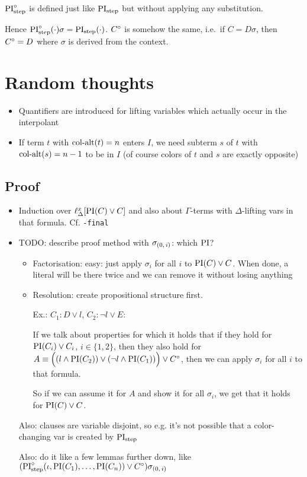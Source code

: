 \documentclass[,%
	draft=false,%
	numbers=noendperiod
	12pt,
	a4paper,
	oneside,%
	openany,
]{memoir}
\begin{document}
\begin{defi}
	$\operatorname{PI}^\circ_{\mathrm{step}}$ is defined just like $\operatorname{PI}_{\mathrm{step}}$ but without applying any substitution.
\end{defi}
Hence $\operatorname{PI}^\circ_{\mathrm{step}}(\cdot) \sigma = \operatorname{PI}_{\mathrm{step}}(\cdot)$.
$C^\circ$ is somehow the same, i.e.\ if $C = D\sigma$, then $C^\circ = D$ where $\sigma$ is derived from the context.

\section{ Random thoughts }

\begin{itemize}
	\item Quantifiers are introduced for lifting variables which actually occur in the interpolant
	\item If term $t$ with $\operatorname{col-alt}(t) = n$ enters $I$, we need subterm $s$ of $t$ with $\operatorname{col-alt}(s) = n-1$ to be in $I$ (of course colors of $t$ and $s$ are exactly opposite)
\end{itemize}


\subsection{ Proof}
\begin{itemize}
	\item Induction over $\ell_{\Delta}^{x}[\operatorname{PI}(C) \lor C]$ and also about $\Gamma$-terms with $\Delta$-lifting vars in that formula. Cf. \texttt{-final}
	\item TODO: describe proof method with $\sigma_{(0,\,i)}$: which $\operatorname{PI}$? 
		\begin{itemize}
			\item Factorisation:
				easy: just apply $\sigma_i$ for all $i$ to $\operatorname{PI}(C) \lor C$. 
				When done, a literal will be there twice and we can remove it without losing anything
			\item Resolution:
				create propositional structure first.

				Ex.: $C_1 : D \lor l$, $ C_2: \lnot l \lor E$:

				If we talk about properties for which it holds that if they hold for $\operatorname{PI}(C_i) \lor C_i$, $i\in\{1,2\}$, then they also hold for $ A \equiv \Big((l \land \operatorname{PI}(C_2)) \lor (\lnot l \land \operatorname{PI}(C_1))\Big) \lor C^\circ$, then we can apply $\sigma_i$ for all $i$ to that formula.

				So if we can assume it for $A$ and show it for all $\sigma_i$, we get that it holds for $\operatorname{PI}(C) \lor C$.

		\end{itemize}

		Also: clauses are variable disjoint, so e.g. it's not possible that a color-changing var is created by $\operatorname{PI}_{\mathrm{step}}$

		Also: do it like a few lemmas further down, like $(\operatorname{PI}^\circ_{\mathrm{step}}(\iota, \operatorname{PI}(C_1), \dots, \operatorname{PI}(C_n)) \lor C^\circ ) \sigma_{(0,\,i)}$
\end{itemize}
\end{document}

